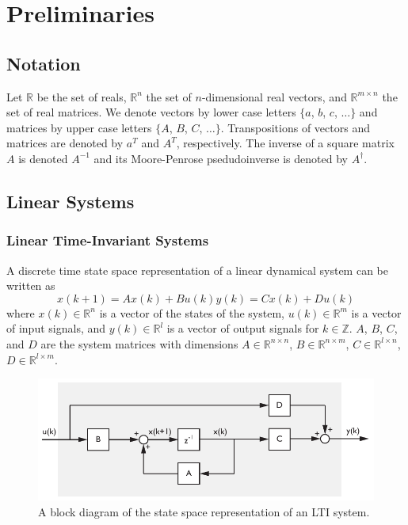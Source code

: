\chapter{Preliminaries}

\section{Notation}
Let $\mathbb{R}$ be the set of reals, $\mathbb{R}^n$ the set of $n$-dimensional real vectors, and $\mathbb{R}^{m\times n}$ the set of real matrices. We denote vectors by lower case letters $\{a$, $b$, $c$, $\dots\}$ and matrices by upper case letters $\{A$, $B$, $C$, $\dots\}$. Transpositions of vectors and matrices are denoted by $a^T$ and $A^T$, respectively. The inverse of a square matrix $A$ is denoted $A^{-1}$ and its Moore-Penrose psedudoinverse is denoted by $A^\dagger$.

\section{Linear Systems}
\subsection{Linear Time-Invariant Systems}\label{sec:linear_time_invariant_systems}
A discrete time state space representation of a linear dynamical system can be written as
\begin{subequations}\label{eq:2_lti}
\begin{equation}x(k+1) = Ax(k) + Bu(k)\end{equation}
\begin{equation}y(k) = Cx(k) + Du(k)\end{equation}
\end{subequations}
where $x(k) \in \mathbb{R}^n$ is a vector of the states of the system, $u(k) \in \mathbb{R}^m$ is a vector of input signals, and $y(k) \in \mathbb{R}^l$ is a vector of output signals for $k \in \mathbb{Z}$. $A$, $B$, $C$, and $D$ are the system matrices with dimensions $A\in\mathbb{R}^{n\times n}$, $B\in\mathbb{R}^{n\times m}$, $C\in\mathbb{R}^{l\times n}$, $D\in\mathbb{R}^{l\times m}$.
\begin{figure}[htb!]
	\centering
	\includegraphics{../fig/lti_block_diagram.pdf}
	\caption{A block diagram of the state space representation of an LTI system.}
\end{figure}

